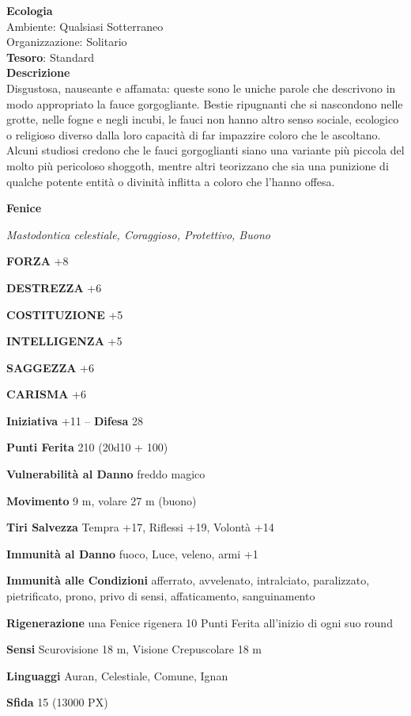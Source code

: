 \begin{multicols}{2}
\textbf{Ecologia}\\
Ambiente: Qualsiasi Sotterraneo\\
Organizzazione: Solitario\\
\textbf{Tesoro}: Standard\\
\textbf{Descrizione}\\
Disgustosa, nauseante e affamata: queste sono le uniche parole che descrivono in modo appropriato la fauce gorgogliante. Bestie ripugnanti che si nascondono nelle grotte, nelle fogne e negli incubi, le fauci non hanno altro senso sociale, ecologico o religioso diverso dalla loro capacità di far impazzire coloro che le ascoltano. Alcuni studiosi credono che le fauci gorgoglianti siano una variante più piccola del molto più pericoloso shoggoth, mentre altri teorizzano che sia una punizione di qualche potente entità o divinità inflitta a coloro che l'hanno offesa.

\medskip{}\textbf{Fenice}

\textit{Mastodontica celestiale, Coraggioso, Protettivo, Buono}

\textbf{FORZA} +8

\textbf{DESTREZZA} +6

\textbf{COSTITUZIONE} +5

\textbf{INTELLIGENZA} +5

\textbf{SAGGEZZA} +6

\textbf{CARISMA} +6

\textbf{Iniziativa} +11 -- \textbf{Difesa} 28

\textbf{Punti Ferita} 210 (20d10 + 100)

\textbf{Vulnerabilità al Danno} freddo magico

\textbf{Movimento} 9 m, volare 27 m (buono)

\textbf{Tiri Salvezza} Tempra +17, Riflessi +19, Volontà +14

\textbf{Immunità al Danno} fuoco, Luce, veleno, armi +1

\textbf{Immunità alle Condizioni} afferrato, avvelenato, intralciato, paralizzato, pietrificato, prono, privo di sensi, affaticamento, sanguinamento

\textbf{Rigenerazione} una Fenice rigenera 10 Punti Ferita all'inizio di ogni suo round

\textbf{Sensi} Scurovisione 18 m, Visione Crepuscolare 18 m

\textbf{Linguaggi} Auran, Celestiale, Comune, Ignan

\textbf{Sfida} 15 (13000 PX)


\end{multicols}
